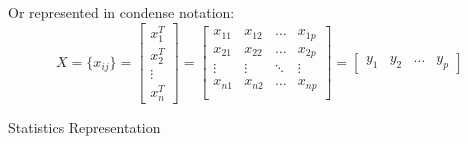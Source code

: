     Or represented in condense notation:
    \begin{equation}
        X=\{x_{ij}\}=
        \begin{bmatrix}
            x_1^T\\x_2^T\\ \vdots \\ x_n^T
        \end{bmatrix}
        =
        \begin{bmatrix}
            x_{11}&x_{12}&\ldots&x_{1p}\\
            x_{21}&x_{22}&\ldots&x_{2p}\\
            \vdots&\vdots&\ddots&\vdots\\
            x_{n1}&x_{n2}&\ldots&x_{np}\\
        \end{bmatrix} 
        =
        \begin{bmatrix}
            y_1&y_2&\ldots &y_p
        \end{bmatrix}
    \end{equation}
\begin{point}
    \hypertarget{StatisticsRepresentation}{Statistics Representation}
\end{point}

